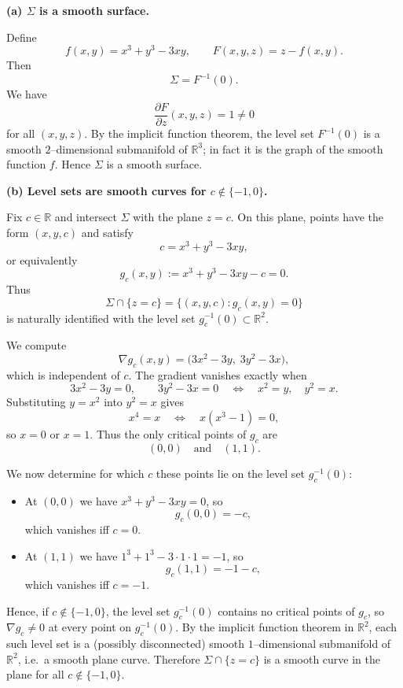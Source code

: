 \begin{solution}
\par\medskip\noindent\textbf{(a) $\Sigma$ is a smooth surface.}\par\smallskip

	Define
	\[
	f(x,y) = x^3 + y^3 - 3xy, \qquad
	F(x,y,z) = z - f(x,y).
	\]
	Then
	\[
	\Sigma = F^{-1}(0).
	\]
	We have
	\[
	\frac{\partial F}{\partial z}(x,y,z) = 1 \neq 0
	\]
	for all $(x,y,z)$.
	By the implicit function theorem, the level set $F^{-1}(0)$ is a smooth
	$2$--dimensional submanifold of $\mathbb{R}^3$; in fact it is the graph of the
	smooth function $f$.  Hence $\Sigma$ is a smooth surface.
	
	\par\medskip\noindent\textbf{(b) Level sets are smooth curves for $c\notin\{-1,0\}$.}\par\smallskip

	Fix $c\in\mathbb{R}$ and intersect $\Sigma$ with the plane $z=c$.
	On this plane, points have the form $(x,y,c)$ and satisfy
	\[
	c = x^3 + y^3 - 3xy,
	\]
	or equivalently
	\[
	g_c(x,y) := x^3 + y^3 - 3xy - c = 0.
	\]
	Thus
	\[
	\Sigma \cap \{z=c\}
	= \{(x,y,c) : g_c(x,y)=0\}
	\]
	is naturally identified with the level set $g_c^{-1}(0)\subset\mathbb{R}^2$.
	
	We compute
	\[
	\nabla g_c(x,y) = \bigl(3x^2 - 3y,\; 3y^2 - 3x\bigr),
	\]
	which is independent of $c$.
	The gradient vanishes exactly when
	\[
	3x^2 - 3y = 0, \qquad 3y^2 - 3x = 0
	\quad\Longleftrightarrow\quad
	x^2 = y, \quad y^2 = x.
	\]
	Substituting $y=x^2$ into $y^2=x$ gives
	\[
	x^4 = x \quad\Longleftrightarrow\quad x(x^3-1)=0,
	\]
	so $x=0$ or $x=1$.  Thus the only critical points of $g_c$ are
	\[
	(0,0) \quad\text{and}\quad (1,1).
	\]
	
	We now determine for which $c$ these points lie on the level set $g_c^{-1}(0)$:
	
	\begin{itemize}
		\item At $(0,0)$ we have $x^3 + y^3 - 3xy = 0$, so
		\[
		g_c(0,0) = -c,
		\]
		which vanishes iff $c=0$.
		\item At $(1,1)$ we have $1^3+1^3-3\cdot1\cdot1 = -1$, so
		\[
		g_c(1,1) = -1 - c,
		\]
		which vanishes iff $c=-1$.
	\end{itemize}
	
	Hence, if $c\notin\{-1,0\}$, the level set $g_c^{-1}(0)$ contains no critical
	points of $g_c$, so $\nabla g_c\neq 0$ at every point on $g_c^{-1}(0)$.
	By the implicit function theorem in $\mathbb{R}^2$, each such level set is a
	(possibly disconnected) smooth $1$--dimensional submanifold of
	$\mathbb{R}^2$, i.e.\ a smooth plane curve.  Therefore
	$\Sigma\cap\{z=c\}$ is a smooth curve in the plane for all
	$c\notin\{-1,0\}$.
	

\end{solution}
